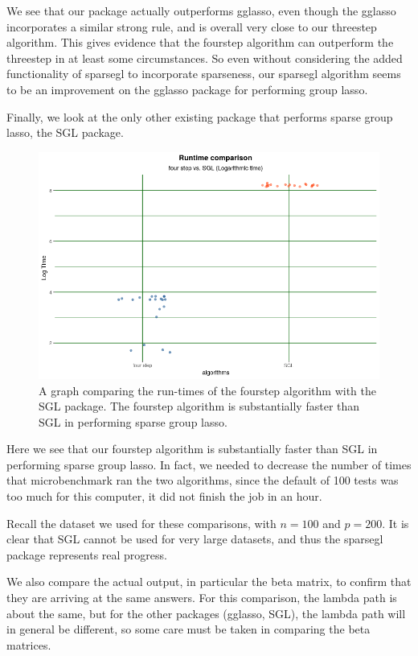 \documentclass[12pt]{article}
\begin{document}
We see that our package actually outperforms gglasso, even though the gglasso incorporates a similar strong rule, and is overall very close to our threestep algorithm. This gives evidence that the fourstep algorithm can outperform the threestep in at least some circumstances. So even without considering the added functionality of sparsegl to incorporate sparseness, our sparsegl algorithm seems to be an improvement on the gglasso package for performing group lasso.

Finally, we look at the only other existing package that performs sparse group lasso, the SGL package.


\begin{figure}[tb!]
\centering
\includegraphics[scale=0.5]{compare_fourSGL.png}
\caption{A graph comparing the run-times of the fourstep algorithm with the SGL package. The fourstep algorithm is substantially faster than SGL in performing sparse group lasso.}
\label{fig:fourvsSGL}
\end{figure}


Here we see that our fourstep algorithm is substantially faster than SGL in performing sparse group lasso. In fact, we needed to decrease the number of times that microbenchmark ran the two algorithms, since the default of 100 tests was too much for this computer, it did not finish the job in an hour.

Recall the dataset we used for these comparisons, with $n=100$ and $p=200$. It is clear that SGL cannot be used for very large datasets, and thus the sparsegl package represents real progress.


We also compare the actual output, in particular the beta matrix, to confirm that they are arriving at the same answers. For this comparison, the lambda path is about the same, but for the other packages (gglasso, SGL), the lambda path will in general be different, so some care must be taken in comparing the beta matrices.
\end{document}
